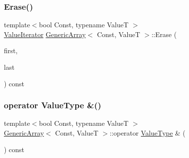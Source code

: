 \mbox{\label{classGenericArray_ac1be0c701ad3aaf0570a8a1ffc715fd5}} 
\subsubsection{\texorpdfstring{Erase()}{Erase()}\hspace{0.1cm}{\footnotesize\ttfamily [2/2]}}
{\footnotesize\ttfamily template$<$bool Const, typename ValueT $>$ \\
\hyperlink{classGenericArray_afc6ad62c3f00531fa378db266182704a}{Value\+Iterator} \hyperlink{classGenericArray}{Generic\+Array}$<$ Const, ValueT $>$\+::Erase (\begin{DoxyParamCaption}\item[{\hyperlink{classGenericArray_a1cd7bb3e75ccfeed3e8b0a6bb5563d68}{Const\+Value\+Iterator}}]{first,  }\item[{\hyperlink{classGenericArray_a1cd7bb3e75ccfeed3e8b0a6bb5563d68}{Const\+Value\+Iterator}}]{last }\end{DoxyParamCaption}) const\hspace{0.3cm}{\ttfamily [inline]}}

\mbox{\label{classGenericArray_a28693c9c06b9e0445df7a5d9c4e8bb18}} 
\subsubsection{\texorpdfstring{operator Value\+Type \&()}{operator ValueType \&()}}
{\footnotesize\ttfamily template$<$bool Const, typename ValueT $>$ \\
\hyperlink{classGenericArray}{Generic\+Array}$<$ Const, ValueT $>$\+::operator \hyperlink{classGenericArray_a93e53f38a99fc5167eb2a28653de64ed}{Value\+Type} \& (\begin{DoxyParamCaption}{ }\end{DoxyParamCaption}) const\hspace{0.3cm}{\ttfamily [inline]}}

\mbox{\label{classGenericArray_addbff152092d0998b2c550bd575f4b83}} 
